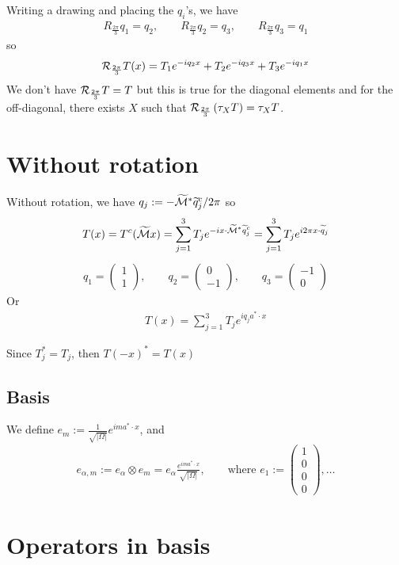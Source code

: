 \documentclass[11pt,a4paper,reqno,french,tikz]{amsart}
\newcommand{\pa}[1]{\left( #1 \right)} %
\newcommand{\ab}[1]{\left|#1\right|} %
\newcommand{\f}[2]{\frac{#1}{#2}} %
\newcommand{\mat}[1]{\begin{pmatrix} #1 \end{pmatrix}} %
\begin{document}
Writing a drawing and placing the $q_i$'s, we have
\begin{align*}
R_{\f{2\pi}3} q_1 = q_2, \qquad R_{\f{2\pi}3} q_2 = q_3, \qquad R_{\f{2\pi}3} q_3 = q_1
\end{align*}
so 
\begin{align*}
\cR_{\f{2\pi}3} T (x) = T_1 e^{-i q_2 x} + T_2 e^{-i q_3 x} + T_3 e^{-iq_1 x}
\end{align*}
We don't have $\cR_{\f{2\pi}3} T = T$ but this is true for the diagonal elements and for the off-diagonal, there exists $X$ such that $\cR_{\f{2\pi}3} \pa{\tau_X T} = \tau_X T$.


\section{Without rotation}%

Without rotation, we have $q_j := -\widetilde{\mathcal{M}}^* \widetilde{q}^c_j /2\pi$ so
\begin{align*}
T(x) = T^c(\widetilde{\mathcal{M}} x) = \sum_{j=1}^3 T_j e^{-ix\cdot \widetilde{\mathcal{M}}^* \widetilde{q}_j^c}= \sum_{j=1}^3 T_j e^{i2\pi x\cdot \widetilde{q}_j}
\end{align*}
\begin{align*}
\boxed{q_1 = \mat{1 \\ 1}, \qquad q_{2} = \mat{0 \\ -1}, \qquad q_{3} = \mat{-1 \\ 0}}
\end{align*}
Or
\begin{align*}
\boxed{T(x) = \sum_{j=1}^3 T_j e^{i q_j a^* \cdot x}}
\end{align*}

Since $T_j^* = T_j$, then $T(-x)^* = T(x)$

\subsection{Basis}%
\label{sub:basis}

We define $e_m := \f{1}{\sqrt{\ab{\Omega}}} e^{i m a^* \cdot x}$, and
\begin{align*}
e_{\alpha,m} := e_\alpha \otimes e_m = e_\alpha \f{e^{ima^*\cdot x}}{\sqrt{\ab{\Omega}}}, \qquad \text{where } e_1 := \mat{1 \\ 0 \\ 0 \\ 0},\dots
\end{align*}


\section{Operators in basis}%
\label{sec:operators_in_basis}
\end{document}
